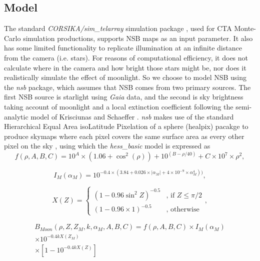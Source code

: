 \subsection{Model}
\label{sec:intro:model}

The standard \textit{CORSIKA/sim\_telarray} simulation package \cite{simtel}, used for CTA Monte-Carlo simulation productions, supports NSB maps as an input parameter. It also has some limited functionality to replicate illumination at an infinite distance from the camera (i.e. stars). For reasons of computational efficiency, it does not calculate where in the camera and how bright those stars might be, nor does it realistically simulate the effect of moonlight. So we choose to model NSB using the \textit{nsb} package, which assumes that NSB comes from two primary sources. The first NSB source is starlight using \textit{Gaia} data, and the second is sky brightness taking account of moonlight and a local extinction coefficient following the semi-analytic model of Krisciunas and Schaeffer \cite{Krisciunas}. \textit{nsb} makes use of the standard Hierarchical Equal Area isoLatitude Pixelation of a sphere (healpix) pacakge to produce skymaps where each pixel covers the same surface area as every other pixel on the sky \cite{healpix}, using which the \textit{hess\_basic} model is expressed as
\begin{equation}
    f(\rho, A, B, C) = 10^{A}\times (1.06+\cos^2(\rho))+10^{(B-\rho/40)}+C \times 10^7 \times \rho^2,
    \label{eq:f}
\end{equation}

\begin{equation}
    I_{M} (\alpha_{M}) = 10^{-0.4 \times (3.84 + 0.026 \times |\alpha_{M}| + 4 \times 10^{-9} \times \alpha_{M}^4))},
    \label{eq:Im}
\end{equation}

\begin{equation}
    X(Z)=\begin{cases} (1-0.96\sin^2 Z)^{-0.5} & \mbox{, if }  Z\leq\pi/2 \\ (1 - 0.96 \times 1)^{-0.5} & \mbox{, otherwise } \end{cases},
\end{equation}

\begin{equation}
\begin{aligned}
    B_{Moon}(\rho,Z,Z_{M},k,\alpha_{M},A,B,C)=f(\rho,A,B,C) \times I_{M}(\alpha_{M}) \\ \times 10^{-0.4kX(Z_{M})}\\ \times [1-10^{-0.4 k X(Z)}]
\end{aligned}
\end{equation}

